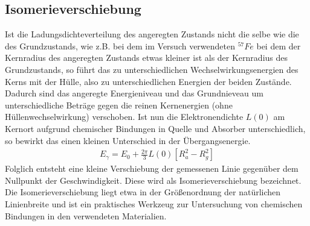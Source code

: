 \documentclass[12pt]{article}
\begin{document}
\subsection{Isomerieverschiebung}
Ist die Ladungsdichteverteilung des angeregten Zustands nicht die selbe wie die des Grundzustands, wie z.B. bei dem im Versuch verwendeten $^{57}Fe$ bei dem der Kernradius
des angeregten Zustands etwas kleiner ist als der Kernradius des Grundzustands, so führt das zu unterschiedlichen Wechselwirkungsenergien des Kerns mit
der Hülle, also zu unterschiedlichen Energien der beiden Zustände. Dadurch sind das angeregte Energieniveau und das Grundnieveau um unterschiedliche Beträge gegen die
reinen Kernenergien (ohne Hüllenwechselwirkung) verschoben. Ist nun die Elektronendichte $L(0)$ am Kernort aufgrund chemischer Bindungen in Quelle und Absorber unterschiedlich,
so bewirkt das einen kleinen Unterschied in der Übergangsenergie.
\begin{align}
 E_\gamma = E_0 + \frac{2\pi}{3} L(0) \left[ R_a^2 - R_g^2\right]
\end{align}
Folglich entsteht eine kleine Verschiebung der gemessenen Linie gegenüber dem Nullpunkt der Geschwindigkeit. Diese wird als Isomerieverschiebung bezeichnet. Die Isomerieverschiebung
liegt etwa in der Größenordnung der natürlichen Linienbreite und ist ein praktisches Werkzeug zur Untersuchung von chemischen Bindungen in den verwendeten Materialien.
\end{document}

